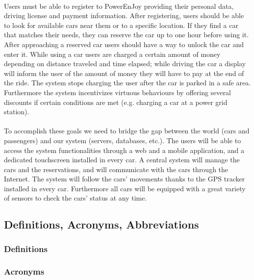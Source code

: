 \documentclass[english]{article}
\begin{document}
\paragraph{}
Users must be able to register to PowerEnJoy providing their personal data, driving license and payment information.
After registering, users should be able to look for available cars near them or to a specific location. If they find a car that matches their needs, they can reserve the car up to one hour before using it. After approaching a reserved car users should have a way to unlock the car and enter it. 
While using a car users are charged a certain amount of money depending on distance traveled and time elapsed; while driving the car a display will inform the user of the amount of money they will have to pay at the end of the ride.
The system stops charging the user after the car is parked in a safe area.
Furthermore the system incentivizes virtuous behaviours by offering several discounts if certain conditions are met (e.g. charging a car at a power grid station).

\paragraph{}
To accomplish these goals we need to bridge the gap between the world (cars and passengers) and our system (servers, databases, etc.).
The users will be able to access the system functionalities through a web and a mobile application, and a dedicated touchscreen installed in every car.
A central system will manage the cars and the reservations, and will communicate with the cars through the Internet. The system will follow the cars’ movements thanks to the GPS tracker installed in every car. Furthermore all cars will be equipped with a great variety of sensors to check the cars’ status at any time.


\subsection{Definitions, Acronyms, Abbreviations}

\subsubsection{Definitions}

\subsubsection{Acronyms}
\end{document}
